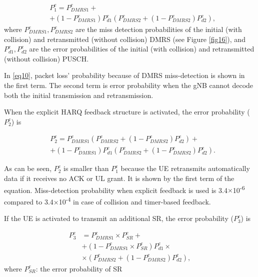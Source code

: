 \documentclass{ieeeaccess}
\begin{document}
\begin{equation}
\begin{split}
 &P^{e}_{1} = P^{e}_{DMRS1} + \\
        &+ (1-P^{e}_{DMRS1})P^{e}_{d1}(P^{e}_{DMRS2} + (1-P^{e}_{DMRS2})P^{e}_{d2}),\label{eq10}   
\end{split}
\end{equation}
where $ P^{e}_{DMRS1}, P^{e}_{DMRS2}$ are the miss detection probabilities of the initial (with collision) and retransmitted (without collision) DMRS (see Figure \ref{fig16}), and $P^{e}_{d1}, P^{e}_{d2}$ are the error probabilities of the initial (with collision) and retransmitted (without collision) PUSCH.

In \eqref{eq10}, packet loss' probability because of DMRS miss-detection is shown in the first term. The second term is error probability when the gNB cannot decode both the initial transmission and retransmission.

When the explicit HARQ feedback structure is activated, the error probability ($ P^{e}_{2}$)  is 

\begin{equation}
\begin{split}
 &P^{e}_{2} = P^{e}_{DMRS1}(P^{e}_{DMRS2} + (1-P^{e}_{DMRS2})P^{e}_{d2}) + \\
        &+ (1-P^{e}_{DMRS1})P^{e}_{d1}(P^{e}_{DMRS2} + (1-P^{e}_{DMRS2})P^{e}_{d2}).\label{eq11}   
\end{split}
\end{equation}

As can be seen, $ P^{e}_{2}$ is smaller than $ P^{e}_{1}$ because the UE retransmits automatically data if it receives no ACK or UL grant. It is shown by the first term of the equation. Miss-detection probability when explicit feedback is used is 3.4$\times$10\textsuperscript{-6} compared to 3.4$\times$10\textsuperscript{-4} in case of collision and timer-based feedback.

If the UE is activated to transmit an additional SR, the error probability ($ P^{e}_{3}$) is 

\begin{equation}
\begin{split}
 P^{e}_{3} &= P^{e}_{DMRS1}\times P^{e}_{SR} + \\
        &+ (1-P^{e}_{DMRS1}\times P^{e}_{SR})P^{e}_{d1}\times\\
        &\times(P^{e}_{DMRS2} + (1-P^{e}_{DMRS2})P^{e}_{d2}),\label{eq12}   
\end{split}
\end{equation}
where $P^{e}_{SR}$: the error probability of SR
\end{document}
